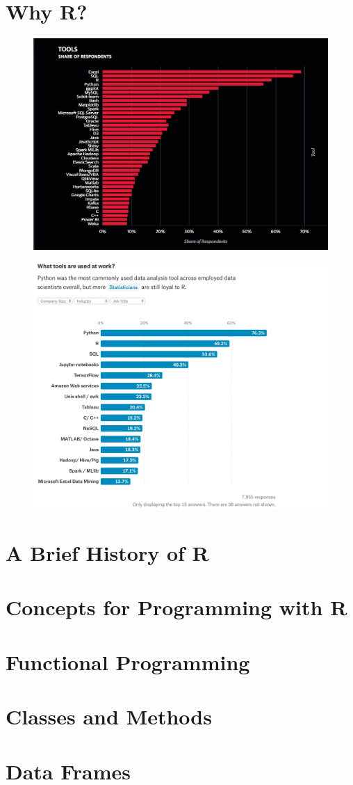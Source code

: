 \documentclass[15pt]{book}\usepackage[]{graphicx}\usepackage[]{color}
\begin{document}
  \section*{Why R?}
    \begin{figure}[ht]
      \includegraphics[width = 5 cm]{./viz/ext/OR_DS_Tools_Survey.jpeg}
    \end{figure}
    \begin{figure}[ht]  
      \includegraphics[width = 5 cm]{./viz/ext/Kaggle_DS_Tools_Survey.jpeg}
    \end{figure}
   \section*{A Brief History of R}
   \section*{Concepts for Programming with R}
   \section*{Functional Programming}
   \section*{Classes and Methods}
   \section*{Data Frames}
    
\end{document}
